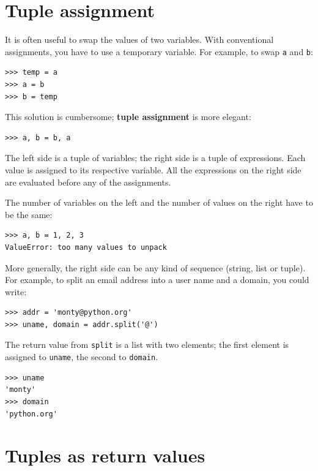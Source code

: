 \documentclass[10pt]{book}
\begin{document}
\section{Tuple assignment}
\label{tuple.assignment}

It is often useful to swap the values of two variables.
With conventional assignments, you have to use a temporary
variable.  For example, to swap {\tt a} and {\tt b}:

\begin{verbatim}
>>> temp = a
>>> a = b
>>> b = temp
\end{verbatim}
%
This solution is cumbersome; {\bf tuple assignment} is more elegant:

\begin{verbatim}
>>> a, b = b, a
\end{verbatim}
%
The left side is a tuple of variables; the right side is a tuple of
expressions.  Each value is assigned to its respective variable.  
All the expressions on the right side are evaluated before any
of the assignments.

The number of variables on the left and the number of
values on the right have to be the same:

\begin{verbatim}
>>> a, b = 1, 2, 3
ValueError: too many values to unpack
\end{verbatim}
%
More generally, the right side can be any kind of sequence
(string, list or tuple).  For example, to split an email address
into a user name and a domain, you could write:

\begin{verbatim}
>>> addr = 'monty@python.org'
>>> uname, domain = addr.split('@')
\end{verbatim}
%
The return value from {\tt split} is a list with two elements;
the first element is assigned to {\tt uname}, the second to
{\tt domain}.

\begin{verbatim}
>>> uname
'monty'
>>> domain
'python.org'
\end{verbatim}
%

\section{Tuples as return values}
\end{document}
